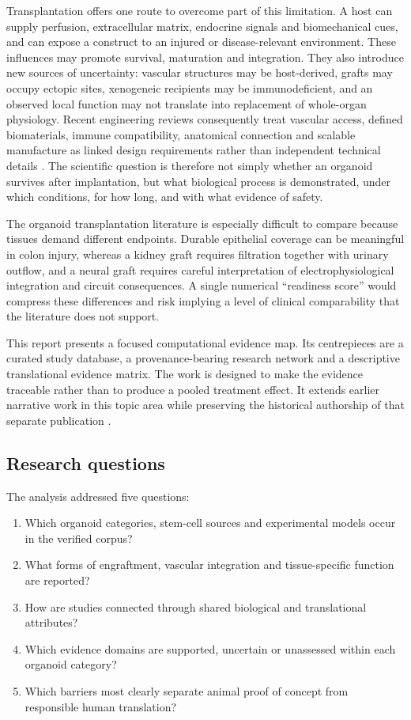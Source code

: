\documentclass[11pt,a4paper]{article}
\begin{document}
Transplantation offers one route to overcome part of this limitation. A host can supply perfusion, extracellular matrix, endocrine signals and biomechanical cues, and can expose a construct to an injured or disease-relevant environment. These influences may promote survival, maturation and integration. They also introduce new sources of uncertainty: vascular structures may be host-derived, grafts may occupy ectopic sites, xenogeneic recipients may be immunodeficient, and an observed local function may not translate into replacement of whole-organ physiology. Recent engineering reviews consequently treat vascular access, defined biomaterials, immune compatibility, anatomical connection and scalable manufacture as linked design requirements rather than independent technical details \citep{brassard2019,park2024}. The scientific question is therefore not simply whether an organoid survives after implantation, but what biological process is demonstrated, under which conditions, for how long, and with what evidence of safety.

The organoid transplantation literature is especially difficult to compare because tissues demand different endpoints. Durable epithelial coverage can be meaningful in colon injury, whereas a kidney graft requires filtration together with urinary outflow, and a neural graft requires careful interpretation of electrophysiological integration and circuit consequences. A single numerical ``readiness score'' would compress these differences and risk implying a level of clinical comparability that the literature does not support.

This report presents a focused computational evidence map. Its centrepieces are a curated study database, a provenance-bearing research network and a descriptive translational evidence matrix. The work is designed to make the evidence traceable rather than to produce a pooled treatment effect. It extends earlier narrative work in this topic area while preserving the historical authorship of that separate publication \citep{sandamini2025}.

\subsection{Research questions}

The analysis addressed five questions:

\begin{enumerate}
  \item Which organoid categories, stem-cell sources and experimental models occur in the verified corpus?
  \item What forms of engraftment, vascular integration and tissue-specific function are reported?
  \item How are studies connected through shared biological and translational attributes?
  \item Which evidence domains are supported, uncertain or unassessed within each organoid category?
  \item Which barriers most clearly separate animal proof of concept from responsible human translation?
\end{enumerate}
\end{document}
